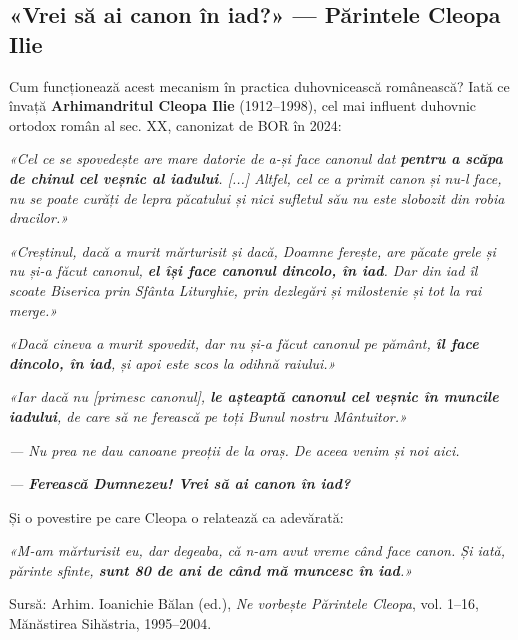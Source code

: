 \documentclass[12pt,a4paper,twoside,openany]{book}
\begin{document}
\subsection{«Vrei să ai canon în iad?» — Părintele Cleopa Ilie}
Cum funcționează acest mecanism în practica duhovnicească românească? Iată ce învață \textbf{Arhimandritul Cleopa Ilie} (1912–1998), cel mai influent duhovnic ortodox român al sec. XX, canonizat de BOR în 2024:


\begin{biblequote}
\textit{«Cel ce se spovedește are mare datorie de a-și face canonul dat \textbf{pentru a scăpa de chinul cel veșnic al iadului}. [...] Altfel, cel ce a primit canon și nu-l face, nu se poate curăți de lepra păcatului și nici sufletul său nu este slobozit din robia dracilor.»}
\end{biblequote}

\begin{biblequote}
\textit{«Creștinul, dacă a murit mărturisit și dacă, Doamne ferește, are păcate grele și nu și-a făcut canonul, \textbf{el își face canonul dincolo, în iad}. Dar din iad îl scoate Biserica prin Sfânta Liturghie, prin dezlegări și milostenie și tot la rai merge.»}
\end{biblequote}

\begin{biblequote}
\textit{«Dacă cineva a murit spovedit, dar nu și-a făcut canonul pe pământ, \textbf{îl face dincolo, în iad}, și apoi este scos la odihnă raiului.»}
\end{biblequote}

\begin{biblequote}
\textit{«Iar dacă nu [primesc canonul], \textbf{le așteaptă canonul cel veșnic în muncile iadului}, de care să ne ferească pe toți Bunul nostru Mântuitor.»}
\end{biblequote}

\begin{biblequote}
\textit{— Nu prea ne dau canoane preoții de la oraș. De aceea venim și noi aici. \\}

\textit{— \textbf{Ferească Dumnezeu! Vrei să ai canon în iad?}}
\end{biblequote}
Și o povestire pe care Cleopa o relatează ca adevărată:


\begin{biblequote}
\textit{«M-am mărturisit eu, dar degeaba, că n-am avut vreme când face canon. Și iată, părinte sfinte, \textbf{sunt 80 de ani de când mă muncesc în iad}.»}
\end{biblequote}
Sursă: Arhim. Ioanichie Bălan (ed.), \textit{Ne vorbește Părintele Cleopa}, vol. 1–16, Mănăstirea Sihăstria, 1995–2004.
\end{document}
